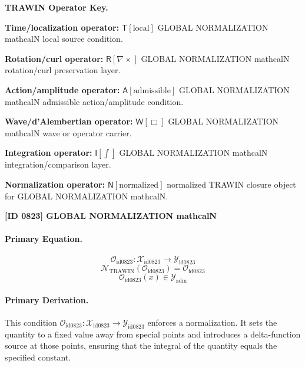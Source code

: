 \par\vspace{0.45\baselineskip}
\noindent\begin{minipage}[t]{\linewidth}
\begingroup
\small
\raggedright
\textbf{TRAWIN Operator Key.}\par
\noindent\textbf{Time/localization operator:} $\mathsf{T}\!\left[\mathrm{local}\right]$ GLOBAL NORMALIZATION mathcalN local source condition.\par
\noindent\textbf{Rotation/curl operator:} $\mathsf{R}\!\left[\nabla\times\right]$ GLOBAL NORMALIZATION mathcalN rotation/curl preservation layer.\par
\noindent\textbf{Action/amplitude operator:} $\mathsf{A}\!\left[\mathrm{admissible}\right]$ GLOBAL NORMALIZATION mathcalN admissible action/amplitude condition.\par
\noindent\textbf{Wave/d'Alembertian operator:} $\mathsf{W}\!\left[\Box\right]$ GLOBAL NORMALIZATION mathcalN wave or operator carrier.\par
\noindent\textbf{Integration operator:} $\mathsf{I}\!\left[\int\right]$ GLOBAL NORMALIZATION mathcalN integration/comparison layer.\par
\noindent\textbf{Normalization operator:} $\mathsf{N}\!\left[\mathrm{normalized}\right]$ normalized TRAWIN closure object for GLOBAL NORMALIZATION mathcalN.\par
\endgroup
\end{minipage}

\clearpage
\noindent\textbf{[ID 0823] GLOBAL NORMALIZATION mathcalN}\par
\vspace{0.35em}
\paragraph{Primary Equation.}
\[
\mathcal{O}_{\mathrm{id0823}}:\mathcal{X}_{\mathrm{id0823}}\longrightarrow\mathcal{Y}_{\mathrm{id0823}}
\]
\[
\mathcal{N}_{\mathrm{TRAWIN}}(\mathcal{O}_{\mathrm{id0823}})=\mathcal{O}_{\mathrm{id0823}}
\]
\[
\mathcal{O}_{\mathrm{id0823}}(x)\in\mathcal{Y}_{\mathrm{adm}}
\]

\paragraph{Primary Derivation.}
This condition \( \mathcal{O}_{\mathrm{id0823}}:\mathcal{X}_{\mathrm{id0823}}\longrightarrow\mathcal{Y}_{\mathrm{id0823}} \) enforces a normalization. It sets the quantity to a fixed value away from special points and introduces a delta-function source at those points, ensuring that the integral of the quantity equals the specified constant.
